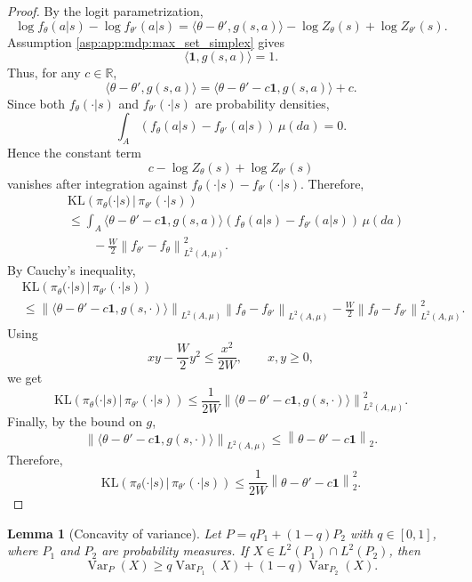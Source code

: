 \documentclass{amsart}
\newtheorem{lemma}[theorem]{Lemma}
\theoremstyle{definition}
\begin{document}
\begin{proof}
By the logit parametrization,
\[
\log f_\theta(a|s)-\log f_{\theta'}(a|s)
=
\langle \theta-\theta',g(s,a)\rangle
-\log Z_\theta(s)+\log Z_{\theta'}(s).
\]
Assumption \ref{asp:app:mdp:max_set_simplex} gives
\[
\langle \mathbf 1,g(s,a)\rangle=1.
\]
Thus, for any $c\in\mathbb R$,
\[
\langle \theta-\theta',g(s,a)\rangle
=
\langle \theta-\theta'-c\mathbf 1,g(s,a)\rangle
+
c.
\]
Since both $f_\theta(\cdot|s)$ and $f_{\theta'}(\cdot|s)$ are probability
densities,
\[
\int_{ A}
\left(
f_\theta(a|s)-f_{\theta'}(a|s)
\right)\,\mu(da)=0.
\]
Hence the constant term
\[
c-\log Z_\theta(s)+\log Z_{\theta'}(s)
\]
vanishes after integration against
$f_\theta(\cdot|s)-f_{\theta'}(\cdot|s)$. Therefore,
\begin{align*}
&\mathrm{KL}\left(
\pi_\theta(\cdot|s)\,|\,\pi_{\theta'}(\cdot|s)
\right) \\
&\le
\int_{ A}
\langle \theta-\theta'-c\mathbf 1,g(s,a)\rangle
\left(
f_\theta(a|s)-f_{\theta'}(a|s)
\right)\,\mu(da) \\
&\qquad
-
\frac{W}{2}
\left\|
f_{\theta'}-f_\theta
\right\|_{L^2(A,\mu)}^2 .
\end{align*}
By Cauchy's inequality,
\begin{align*}
&\mathrm{KL}\left(
\pi_\theta(\cdot|s)\,|\,\pi_{\theta'}(\cdot|s)
\right) \\
&\le
\left\|
\langle \theta-\theta'-c\mathbf 1,g(s,\cdot)\rangle
\right\|_{L^2(A,\mu)}
\left\|
f_\theta-f_{\theta'}
\right\|_{L^2(A,\mu)}
-
\frac{W}{2}
\left\|
f_\theta-f_{\theta'}
\right\|_{L^2(A,\mu)}^2 .
\end{align*}
Using
\[
xy-\frac{W}{2}y^2\le \frac{x^2}{2W},
\qquad x,y\ge 0,
\]
we get
\[
\mathrm{KL}\left(
\pi_\theta(\cdot|s)\,|\,\pi_{\theta'}(\cdot|s)
\right)
\le
\frac{1}{2W}
\left\|
\langle \theta-\theta'-c\mathbf 1,g(s,\cdot)\rangle
\right\|_{L^2(A,\mu)}^2 .
\]
Finally, by the bound on $g$,
\[
\left\|
\langle \theta-\theta'-c\mathbf 1,g(s,\cdot)\rangle
\right\|_{L^2(A,\mu)}
\le
\left\|
\theta-\theta'-c\mathbf 1
\right\|_2 .
\]
Therefore,
\[
\mathrm{KL}\left(
\pi_\theta(\cdot|s)\,|\,\pi_{\theta'}(\cdot|s)
\right)
\le
\frac{1}{2W}
\left\|
\theta-\theta'-c\mathbf 1
\right\|_2^2 .
\]
\end{proof}

\begin{lemma}[Concavity of variance]\label{lem:app:concavity_of_var}
Let $P=qP_1+(1-q)P_2$ with $q\in[0,1]$, where $P_1$ and $P_2$ are
probability measures. 
If $X\in L^2(P_1)\cap L^2(P_2)$, then
\[
\operatorname{Var}_P(X)
\ge
q\operatorname{Var}_{P_1}(X)
+
(1-q)\operatorname{Var}_{P_2}(X).
\]
\end{lemma}
\end{document}
